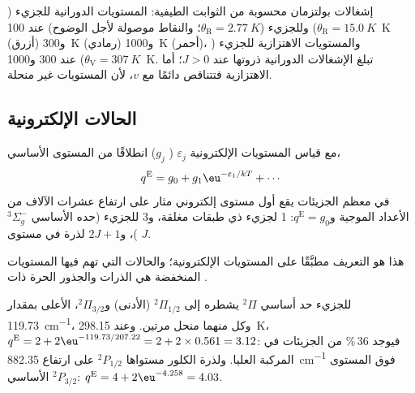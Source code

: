 \begin{omfigure}
{\small إشغالات بولتزمان محسوبة من الثوابت الطيفية:
المستويات الدورانية للجزيء  ($\theta_{\mathrm R} = \qty{15.0}{K}$) وللجزيء 
($\theta_{\mathrm R} = \qty{2.77}{K}$؛ والنقاط موصولة لأجل الوضوح) عند \qty{100}{K} (أزرق) و\qty{300}{K} (رمادي) و\qty{1000}{K} (أحمر)، 
والمستويات الاهتزازية للجزيء  ($\theta_{\mathrm V} = \qty{307}{K}$) عند 300 و\qty{1000}{K}. تبلغ الإشغالات
الدورانية ذروتها عند $J > 0$؛ أما الاهتزازية فتتناقص دائمًا مع $v$، لأن
المستويات غير منحلة.}
\end{omfigure}

\subsection*{الحالات الإلكترونية}

\begin{proposition}\label{prop:b3:partition-functions:q-elec}
مع قياس المستويات الإلكترونية $\varepsilon_j$ ( $g_j$) انطلاقًا من
المستوى الأساسي،
\[
  q^{\mathrm E} = g_0 + g_1\eu^{-\varepsilon_1/kT} + \cdots
\]
في معظم الجزيئات يقع أول مستوى إلكتروني مثار على ارتفاع عشرات الآلاف من
الأعداد الموجية و$q^{\mathrm E} = g_0$: 1 لجزيء ذي طبقات مغلقة، و3 للجزيء
 (حده الأساسي ${}^3\Sigma_g^-$)، و$2J + 1$ لذرة في مستوى $J$.
\end{proposition}

هذا هو التعريف مطبَّقًا على المستويات الإلكترونية؛ والحالات التي تهم فيها
المستويات المنخفضة هي الذرات والجذور الحرة ذات .

\begin{example}\label{ex:b3:partition-functions:no-cl}
للجزيء  حد أساسي ${}^2\Pi$ يشطره  إلى ${}^2\Pi_{1/2}$ (الأدنى)
و${}^2\Pi_{3/2}$، الأعلى بمقدار \qty{119.73}{cm^{-1}}، وكل منهما منحل مرتين. وعند \qty{298.15}{K}،
$q^{\mathrm E} = 2 + 2\eu^{-119.73/207.22} = 2 + 2\times0.561 = 3.12$: فيوجد 36\,\% من الجزيئات في
المركبة العليا. ولذرة الكلور مستواها ${}^2P_{1/2}$ على ارتفاع \qty{882.35}{cm^{-1}}
فوق المستوى الأساسي ${}^2P_{3/2}$: $q^{\mathrm E} = 4 + 2\eu^{-4.258} = 4.03$.
\end{example}

